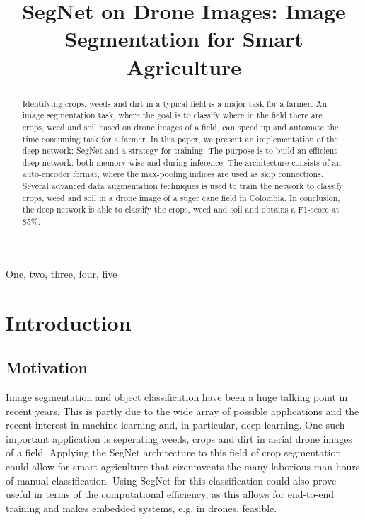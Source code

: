 \documentclass{article}
\title{SegNet on Drone Images: Image Segmentation for Smart Agriculture}
\begin{document}
%

\maketitle
%
\begin{abstract}
 Identifying crops, weeds and dirt in a typical field is a major task for a farmer. An image segmentation task, where the goal is to classify where in the field there are crops, weed and soil based on drone images of a field, can speed up and automate the time consuming task for a farmer. In this paper, we present an implementation of the deep network: SegNet and a strategy for training. The purpose is to build an efficient deep network: both memory wise and during inference. The architecture consists of an auto-encoder format, where the max-pooling indices are used as skip connections. Several advanced data augmentation techniques is used to train the network to classify crops, weed and soil in a drone image of a suger cane field in Colombia. In conclusion, the deep network is able to classify the crops, weed and soil and obtains a F1-score at $ 85 \% $. 
\end{abstract}
%
\begin{keywords}
One, two, three, four, five
\end{keywords}
%
\section{Introduction}
\label{sec:intro}

\subsection{Motivation}
Image segmentation and object classification have been a huge talking point in recent years. This is partly due to the wide array of possible applications and the recent interest in machine learning and, in particular, deep learning. One such important application is seperating weeds, crops and dirt in aerial drone images of a field. Applying the SegNet architecture to this field of crop segmentation could allow for smart agriculture that circumvents the many laborious man-hours of manual classification. Using SegNet for this classification could also prove useful in terms of the computational efficiency, as this allows for end-to-end training and makes embedded systems, e.g. in drones, feasible.
\end{document}
